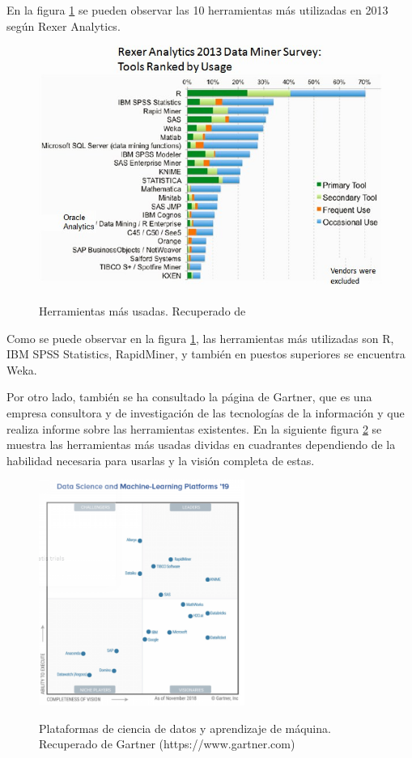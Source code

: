 En la figura \ref{fig:top10tools} se pueden observar las 10 herramientas más utilizadas en 2013 según Rexer Analytics. \cite{rexer2013}

\begin{figure}[htb]
	\centering
	\caption{Herramientas más usadas. Recuperado de \protect\cite{rexer2013}}
	\includegraphics[width=1\textwidth]{recursos/top10tools}
	\label{fig:top10tools}
\end{figure}
\FloatBarrier

Como se puede observar en la figura \ref{fig:top10tools}, las herramientas más utilizadas son R, IBM SPSS Statistics, RapidMiner, y también en puestos superiores se encuentra Weka.

Por otro lado, también se ha consultado la página de Gartner, que es una empresa consultora y de investigación de las tecnologías de la información y que realiza informe sobre las herramientas existentes. En la siguiente figura \ref{fig:gartner} se muestra las herramientas más usadas dividas en cuadrantes dependiendo de la habilidad necesaria para usarlas y la visión completa de estas.

\begin{figure}[htb]
	\centering
	\caption{Plataformas de ciencia de datos y aprendizaje de máquina. Recuperado de Gartner (https://www.gartner.com)}
	\includegraphics[width=0.6\textwidth]{recursos/gartner}
	\label{fig:gartner}
\end{figure}
\FloatBarrier

